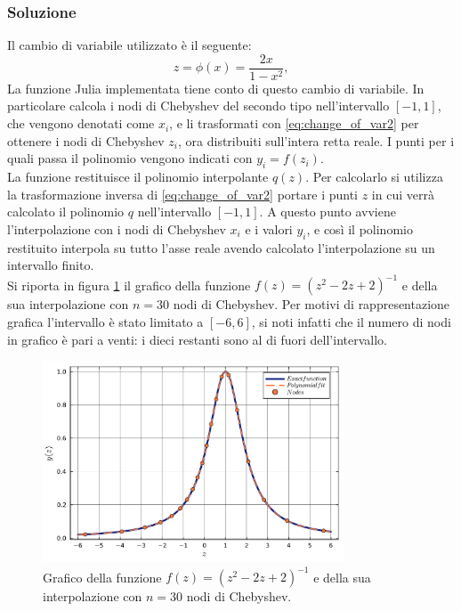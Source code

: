 \documentclass[letterpaper, 12pt]{article}
\begin{document}
\subsubsection{Soluzione}
Il cambio di variabile utilizzato è il seguente: 
\begin{equation}
    \label{eq:change_of_var2}
    z = \phi(x) = \frac{2x}{1 - x^2},
\end{equation}
La funzione Julia implementata tiene conto di questo cambio di variabile. In particolare calcola i nodi 
di Chebyshev del secondo tipo nell'intervallo $[-1, 1]$, che vengono denotati come $x_i$, e li trasformati 
con \ref{eq:change_of_var2} per ottenere i nodi di Chebyshev $z_i$, ora distribuiti sull'intera retta reale. 
I punti per i quali passa il polinomio vengono indicati con $y_i = f(z_i)$. \\
La funzione restituisce il polinomio interpolante $q(z)$. Per calcolarlo si utilizza la trasformazione inversa
di \ref{eq:change_of_var2} portare i punti $z$ in cui verrà calcolato il polinomio $q$ nell'intervallo $[-1, 1]$.
A questo punto avviene l'interpolazione con i nodi di Chebyshev $x_i$ e i valori $y_i$, e così il polinomio
restituito interpola su tutto l'asse reale avendo calcolato l'interpolazione su un intervallo finito. \\
Si riporta in figura \ref{fig:es4_4_4_1} il grafico della funzione $f(z)=(z^2-2z+2)^{-1}$ e della sua interpolazione
con $n=30$ nodi di Chebyshev. Per motivi di rappresentazione grafica l'intervallo è stato limitato a $[-6, 6]$, 
si noti infatti che il numero di nodi in grafico è pari a venti: i dieci restanti sono al di fuori dell'intervallo.
\begin{figure}[!ht]
    \centering
    \includegraphics[width=0.8\textwidth]{4441.pdf}
    \caption{Grafico della funzione $f(z)=(z^2-2z+2)^{-1}$ e della sua interpolazione con $n=30$ nodi di Chebyshev.}
    \label{fig:es4_4_4_1}
\end{figure}
\end{document}
